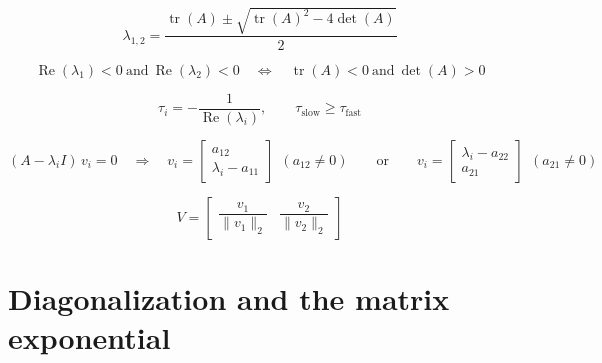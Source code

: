 \documentclass[11pt,a4paper]{article}
\begin{document}
\begin{equation}
  \lambda_{1,2} = \frac{\operatorname{tr}(A) \pm \sqrt{\operatorname{tr}(A)^{2} - 4\det(A)}}{2}
  \label{eq:eigenvalues}
\end{equation}

\begin{equation}
  \operatorname{Re}(\lambda_1) < 0 \ \text{and}\ \operatorname{Re}(\lambda_2) < 0
  \quad\Longleftrightarrow\quad
  \operatorname{tr}(A) < 0 \ \text{and}\ \det(A) > 0
  \label{eq:stability}
\end{equation}

\begin{equation}
  \tau_i = -\frac{1}{\operatorname{Re}(\lambda_i)}, \qquad \tau_{\mathrm{slow}} \ge \tau_{\mathrm{fast}}
  \label{eq:time-constant}
\end{equation}

\begin{equation}
  (A - \lambda_i I)\,v_i = 0
  \quad\Longrightarrow\quad
  v_i = \begin{bmatrix} a_{12} \\ \lambda_i - a_{11} \end{bmatrix}
  \ \ (a_{12} \neq 0)
  \qquad\text{or}\qquad
  v_i = \begin{bmatrix} \lambda_i - a_{22} \\ a_{21} \end{bmatrix}
  \ \ (a_{21} \neq 0)
  \label{eq:eigenvector}
\end{equation}

\begin{equation}
  V = \begin{bmatrix} \dfrac{v_1}{\|v_1\|_2} & \dfrac{v_2}{\|v_2\|_2} \end{bmatrix}
  \label{eq:eigenvector-matrix}
\end{equation}

\section{Diagonalization and the matrix exponential}
\end{document}
